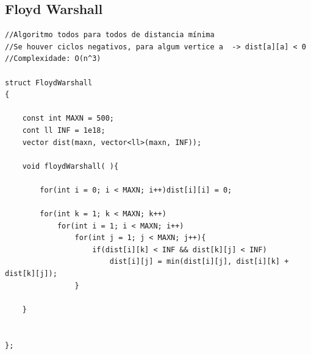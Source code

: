 \documentclass[11pt, a4paper, twoside]{article}
\begin{document}
\subsection{Floyd Warshall}
\begin{verbatim}
//Algoritmo todos para todos de distancia mínima
//Se houver ciclos negativos, para algum vertice a  -> dist[a][a] < 0
//Complexidade: O(n^3)

struct FloydWarshall
{   
    
    const int MAXN = 500;
    cont ll INF = 1e18;
    vector dist(maxn, vector<ll>(maxn, INF));
    
    void floydWarshall( ){
    
        for(int i = 0; i < MAXN; i++)dist[i][i] = 0;
    
        for(int k = 1; k < MAXN; k++)
            for(int i = 1; i < MAXN; i++)
                for(int j = 1; j < MAXN; j++){
                    if(dist[i][k] < INF && dist[k][j] < INF)
                        dist[i][j] = min(dist[i][j], dist[i][k] + dist[k][j]);
                }
                
    }
    
    
};
\end{verbatim}
\end{document}
